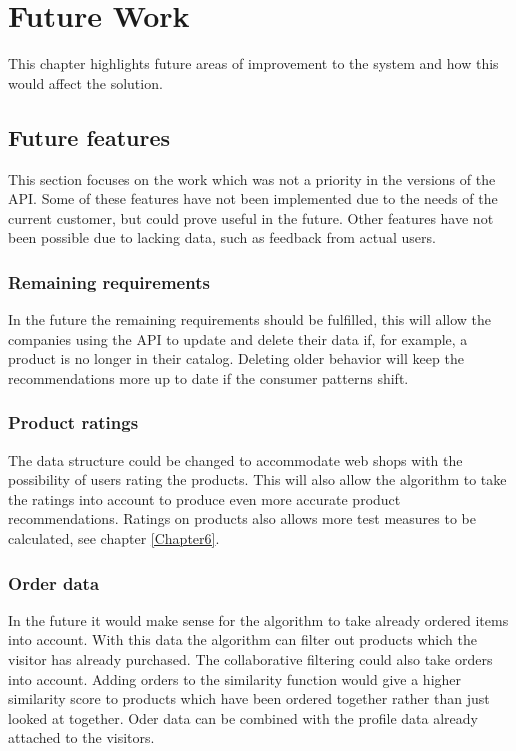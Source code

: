 
\chapter{Future Work} %

\label{Chapter9} %

This chapter highlights future areas of improvement to the system and how this would affect the solution.

\section{Future features}
This section focuses on the work which was not a priority in the versions of the API. Some of these features have not been implemented due to the needs of the current customer, but could prove useful in the future. Other features have not been possible due to lacking data, such as feedback from actual users.

\subsection{Remaining requirements}
In the future the remaining requirements should be fulfilled, this will allow the companies using the API to update and delete their data if, for example, a  product is no longer in their catalog. Deleting older behavior will keep the recommendations more up to date if the consumer patterns shift.

\subsection{Product ratings}
The data structure could be changed to accommodate web shops with the possibility of users rating the products. This will also allow the algorithm to take the ratings into account to produce even more accurate product recommendations. Ratings on products also allows more test measures to be calculated, see chapter \ref{Chapter6}.

\subsection{Order data}
In the future it would make sense for the algorithm to take already ordered items into account. With this data the algorithm can filter out products which the visitor has already purchased. The collaborative filtering could also take orders into account. Adding orders to the similarity function would give a higher similarity score to products which have been ordered together rather than just looked at together. Oder data can be combined with the profile data already attached to the visitors.

